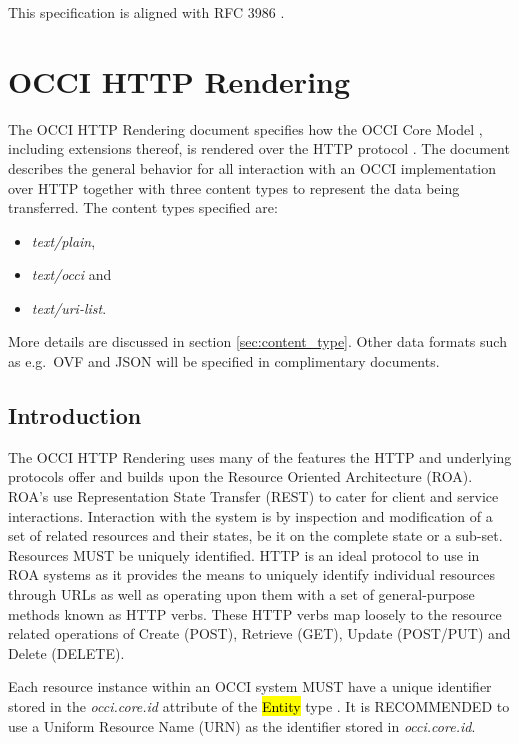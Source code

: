 \documentclass[10pt,a4paper]{article}
\begin{document}
This specification is aligned with RFC 3986 \cite{rfc3986}.

\section{OCCI HTTP Rendering}
The OCCI HTTP Rendering document specifies how the OCCI Core Model
\cite{occi:core}, including extensions thereof, is rendered over the
HTTP protocol \cite{rfc2616}. The document describes the general
behavior for all interaction with an OCCI implementation over HTTP
together with three content types to represent the data being
transferred. The content types specified are:

\begin{itemize}
	\item \textit{text/plain},
	\item \textit{text/occi} and 
	\item \textit{text/uri-list}. 
\end{itemize}

More details are discussed in section \ref{sec:content_type}. Other
data formats such as e.g.~OVF and JSON will be specified in
complimentary documents.

\subsection{Introduction}
The OCCI HTTP Rendering uses many of the features the HTTP and
underlying protocols offer and builds upon the Resource Oriented
Architecture (ROA). ROA's use Representation State Transfer (REST)
\cite{REST_Fielding} to cater for client and service
interactions. Interaction with the system is by inspection and
modification of a set of related resources and their states, be it on
the complete state or a sub-set. Resources MUST be uniquely
identified. HTTP is an ideal protocol to use in ROA systems as it
provides the means to uniquely identify individual resources through
URLs as well as operating upon them with a set of general-purpose
methods known as HTTP verbs. These HTTP verbs map loosely to the
resource related operations of Create (POST), Retrieve (GET), Update
(POST/PUT) and Delete (DELETE).

Each resource instance within an OCCI system MUST have a unique
identifier stored in the \emph{occi.core.id} attribute of the
\hl{Entity} type \cite{occi:core}.
It is RECOMMENDED to use a Uniform Resource Name (URN) as the
identifier stored in \emph{occi.core.id}.
\end{document}
